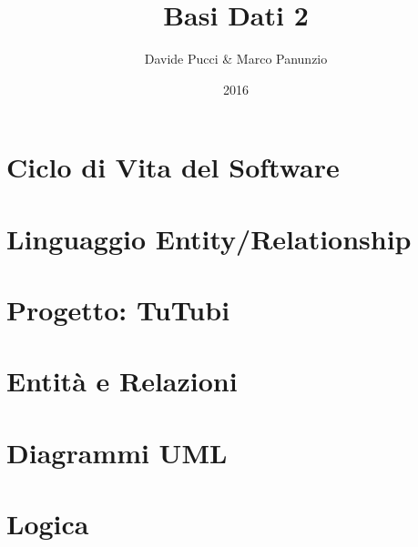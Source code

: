 

\title{Basi Dati 2}
\author{Davide Pucci \& Marco Panunzio}
\date{2016}

\maketitle

\tableofcontents

\chapter{Ciclo di Vita del Software}


\chapter{Linguaggio Entity/Relationship}


\chapter{Progetto: TuTubi}


\chapter{Entità e Relazioni}


\chapter{Diagrammi UML}


\chapter{Logica}


